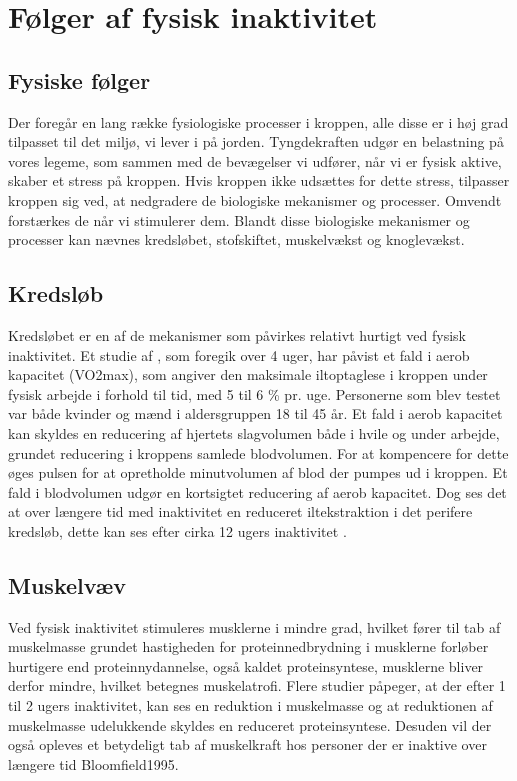 \section{Følger af fysisk inaktivitet}

\subsection{Fysiske følger}

Der foregår en lang række fysiologiske processer i kroppen, alle disse er i høj grad tilpasset til det miljø, vi lever i på jorden. Tyngdekraften udgør en belastning på vores legeme, som sammen med de bevægelser vi udfører, når vi er fysisk aktive, skaber et stress på kroppen. Hvis kroppen ikke udsættes for dette stress, tilpasser kroppen sig ved, at nedgradere de biologiske mekanismer og processer. Omvendt forstærkes de når vi stimulerer dem. Blandt disse biologiske mekanismer og processer kan nævnes kredsløbet, stofskiftet, muskelvækst og knoglevækst.\citep{motionsraad2007}

\subsection{Kredsløb}
Kredsløbet er en af de mekanismer som påvirkes relativt hurtigt ved fysisk inaktivitet. Et studie af \citeauthor{Convertino1995}, som foregik over 4 uger, har påvist et fald i aerob kapacitet (VO2max), som angiver den maksimale iltoptaglese i kroppen under fysisk arbejde i forhold til tid, med 5 til 6 \% pr. uge. Personerne som blev testet var både kvinder og mænd i aldersgruppen 18 til 45 år. Et fald i aerob kapacitet kan skyldes en reducering af hjertets slagvolumen både i hvile og under arbejde, grundet reducering i kroppens samlede blodvolumen. For at kompencere for dette øges pulsen for at opretholde minutvolumen af blod der pumpes ud i kroppen. Et fald i blodvolumen udgør en kortsigtet reducering af aerob kapacitet.\citep{Convertino1995} Dog ses det at over længere tid med inaktivitet en reduceret iltekstraktion i det perifere kredsløb, dette kan ses efter cirka 12 ugers inaktivitet \citep{Coyle1985}.

\subsection{Muskelvæv}
Ved fysisk inaktivitet stimuleres musklerne i mindre grad, hvilket fører til tab af muskelmasse grundet hastigheden for proteinnedbrydning i musklerne forløber hurtigere end proteinnydannelse, også kaldet proteinsyntese, musklerne bliver derfor mindre, hvilket betegnes muskelatrofi. Flere studier påpeger, at der efter 1 til 2 ugers inaktivitet, kan ses en reduktion i muskelmasse og at reduktionen af muskelmasse udelukkende skyldes en reduceret proteinsyntese\citep{Douglas2006}. \citep{Bloomsfield1995} Desuden vil der også opleves et betydeligt tab af muskelkraft hos personer der er inaktive over længere tid {Bloomfield1995}. 

